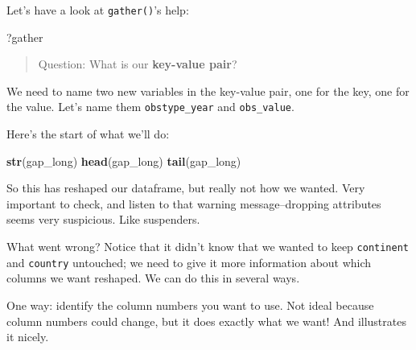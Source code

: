 \documentclass[]{book}
\newenvironment{Shaded}{\begin{snugshade}}{\end{snugshade}}
\newcommand{\KeywordTok}[1]{\textcolor[rgb]{0.13,0.29,0.53}{\textbf{{#1}}}}
\newcommand{\DataTypeTok}[1]{\textcolor[rgb]{0.13,0.29,0.53}{{#1}}}
\newcommand{\DecValTok}[1]{\textcolor[rgb]{0.00,0.00,0.81}{{#1}}}
\newcommand{\StringTok}[1]{\textcolor[rgb]{0.31,0.60,0.02}{{#1}}}
\newcommand{\CommentTok}[1]{\textcolor[rgb]{0.56,0.35,0.01}{\textit{{#1}}}}
\newcommand{\NormalTok}[1]{{#1}}
\theoremstyle{definition}
\theoremstyle{definition}
\theoremstyle{definition}
\theoremstyle{remark}
\begin{document}
Let's have a look at \texttt{gather()}'s help:

\begin{Shaded}
\begin{Highlighting}[]
\NormalTok{?gather}
\end{Highlighting}
\end{Shaded}

\begin{quote}
Question: What is our \textbf{key-value pair}?
\end{quote}

We need to name two new variables in the key-value pair, one for the
key, one for the value. Let's name them \texttt{obstype\_year} and
\texttt{obs\_value}.

Here's the start of what we'll do:

\begin{Shaded}
\end{Shaded}

\begin{Shaded}
\begin{Highlighting}[]
\KeywordTok{str}\NormalTok{(gap_long)}
\KeywordTok{head}\NormalTok{(gap_long)}
\KeywordTok{tail}\NormalTok{(gap_long)}
\end{Highlighting}
\end{Shaded}

So this has reshaped our dataframe, but really not how we wanted. Very
important to check, and listen to that warning message--dropping
attributes seems very suspicious. Like suspenders.

What went wrong? Notice that it didn't know that we wanted to keep
\texttt{continent} and \texttt{country} untouched; we need to give it
more information about which columns we want reshaped. We can do this in
several ways.

One way: identify the column numbers you want to use. Not ideal because
column numbers could change, but it does exactly what we want! And
illustrates it nicely.

\begin{Shaded}
\end{Shaded}
\end{document}
